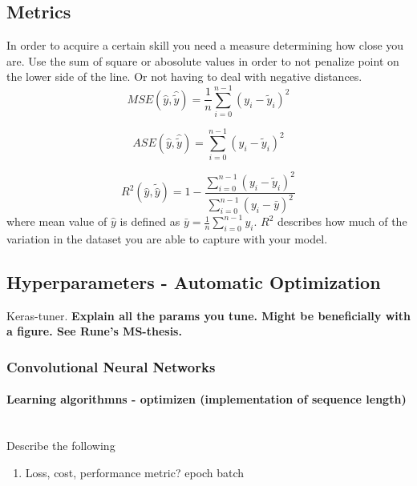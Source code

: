 \subsection{Metrics}  \label{sec:metrics}
In order to acquire a certain skill you need a measure determining how close you are. 
Use the sum of square or abosolute values in order to not penalize point on the lower side of the line. Or not having to deal with negative distances. 
\begin{equation} \label{eq:mse}
    MSE(\hat{y},\hat{\tilde{y}}) = \frac{1}{n} \sum_{i=0}^{n-1}(y_i-\tilde{y}_i)^2
\end{equation} 

\begin{equation} \label{eq:ase}
    ASE(\hat{y},\hat{\tilde{y}}) =  \sum_{i=0}^{n-1}(y_i-\tilde{y}_i)^2
\end{equation} 

\begin{equation} \label{eq:r2}
    R^2(\hat{y}, \tilde{\hat{y}}) = 1 - \frac{\sum_{i=0}^{n - 1} (y_i - \tilde{y}_i)^2}{\sum_{i=0}^{n - 1} (y_i - \bar{y})^2}
\end{equation} 
where mean value of $\hat{y}$ is defined as $\bar{y} =  \frac{1}{n} \sum_{i=0}^{n - 1} y_i$. $R^2$ describes how much of the variation in the dataset you are able to capture with your model.



\subsection{Hyperparameters - Automatic Optimization}
Keras-tuner.
\textbf{Explain all the params you tune. Might be beneficially with a figure. See Rune's MS-thesis.}



\subsubsection{Convolutional Neural Networks}



\paragraph{Learning algorithmns - optimizen (implementation of sequence length)} \mbox{}\\
Describe the following
\begin{enumerate}
    \item Loss, cost, performance metric? epoch batch
\end{enumerate}

